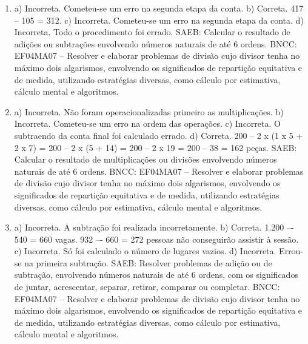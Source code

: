 
\begin{enumerate}
\item
a) Incorreta. Cometeu-se um erro na segunda etapa da conta.
b) Correta. 417 – 105 = 312.
c) Incorreta. Cometeu-se um erro na segunda etapa da conta.
d) Incorreta. Todo o procedimento foi errado.
SAEB: Calcular o resultado de adições ou subtrações envolvendo números naturais de até 6 ordens.
BNCC: EF04MA07 -- Resolver e elaborar problemas de divisão cujo divisor tenha no máximo dois algarismos,
envolvendo os significados de repartição equitativa e de medida, utilizando estratégias diversas,
como cálculo por estimativa, cálculo mental e algoritmos.

\item
a) Incorreta. Não foram operacionalizadas primeiro as multiplicações.
b) Incorreta. Cometeu-se um erro na ordem das operações.
c) Incorreta. O subtraendo da conta final foi calculado errado.
d) Correta. 200 -- 2 x (1 x 5 + 2 x 7) = 200 -- 2 x (5 + 14) = 200 -- 2 x 19 = 200 -- 38 = 162 peças.
SAEB: Calcular o resultado de multiplicações ou divisões envolvendo números naturais de até 6 ordens.
BNCC: EF04MA07 -- Resolver e elaborar problemas de divisão cujo divisor tenha no máximo dois algarismos,
envolvendo os significados de repartição equitativa e de medida, utilizando estratégias diversas,
como cálculo por estimativa, cálculo mental e algoritmos.

\item
a) Incorreta. A subtração foi realizada incorretamente.
b) Correta. 1.200 –- 540 = 660 vagas. 932 –- 660 = 272 pessoas não conseguirão assistir à sessão.
c) Incorreta. Só foi calculado o número de lugares vazios.
d) Incorreta. Errou-se na primeira subtração.
SAEB: Resolver problemas de adição ou de subtração, envolvendo números naturais de até 6 ordens, com os significados de juntar, acrescentar, separar, retirar, comparar ou completar.
BNCC: EF04MA07 -- Resolver e elaborar problemas de divisão cujo divisor tenha no máximo dois algarismos,
envolvendo os significados de repartição equitativa e de medida, utilizando estratégias diversas,
como cálculo por estimativa, cálculo mental e algoritmos.
\end{enumerate}


